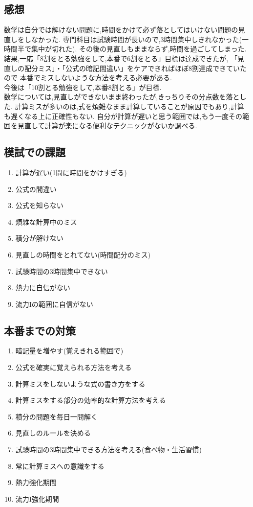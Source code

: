 \documentclass[a4paper]{jsarticle}
\begin{document}
\subsection{感想}
数学は自分では解けない問題に,時間をかけて必ず落としてはいけない問題の見直しをしなかった.
専門科目は試験時間が長いので,3時間集中しきれなかった(一時間半で集中が切れた).
その後の見直しもままならず,時間を過ごしてしまった.\\
結果,一応「8割をとる勉強をして,本番で6割をとる」目標は達成できたが,
「見直しの配分ミス」・「公式の暗記間違い」をケアできればほぼ8割達成できていたので
本番でミスしないような方法を考える必要がある.\\
今後は「10割とる勉強をして,本番8割とる」が目標.\\
数学については,見直しができないまま終わったが,きっちりその分点数を落とした.
計算ミスが多いのは,式を煩雑なまま計算していることが原因でもあり,計算も遅くなる上に正確性もない.
自分が計算が遅いと思う範囲では,もう一度その範囲を見直して計算が楽になる便利なテクニックがないか調べる.
\subsection{模試での課題}
\begin{enumerate}[(1)]
    \item 計算が遅い(1問に時間をかけすぎる)
    \item 公式の間違い
    \item 公式を知らない
    \item 煩雑な計算中のミス
    \item 積分が解けない
    \item 見直しの時間をとれてない(時間配分のミス)
    \item 試験時間の3時間集中できない
    \item 熱力に自信がない
    \item 流力Iの範囲に自信がない
\end{enumerate}
\subsection{本番までの対策}
\begin{enumerate}[(1)]
    \item 暗記量を増やす(覚えきれる範囲で)
    \item 公式を確実に覚えられる方法を考える
    \item 計算ミスをしないような式の書き方をする
    \item 計算ミスをする部分の効率的な計算方法を考える
    \item 積分の問題を毎日一問解く
    \item 見直しのルールを決める
    \item 試験時間の3時間集中できる方法を考える(食べ物・生活習慣)
    \item 常に計算ミスへの意識をする
    \item 熱力強化期間
    \item 流力I強化期間
\end{enumerate}
\end{document}
